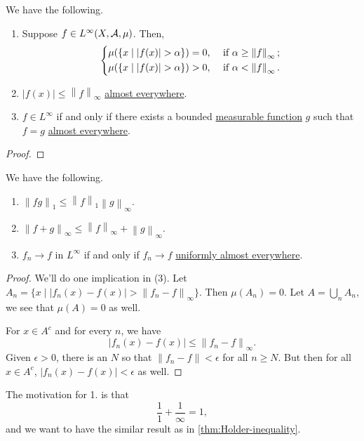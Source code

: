 \begin{lemma}
	We have the following.
	\begin{enumerate}[(1)]
		\item Suppose \(f\in L^{\infty} (X, \mathcal{\MakeUppercase{a}} , \mu )\). Then,
		      \[
			      \begin{dcases}
				      \mu (\{x\mid \left\vert f(x) \right\vert > \alpha \}) = 0, & \text{ if } \alpha \geq \left\lVert f\right\rVert _\infty; \\
				      \mu (\{x\mid \left\vert f(x) \right\vert > \alpha \}) > 0, & \text{ if } \alpha < \left\lVert f\right\rVert _\infty.    \\
			      \end{dcases}
		      \]
		\item \(\left\vert f(x) \right\vert \leq \left\lVert f\right\rVert _\infty \) \hyperref[def:mu-almost-everywhere]{almost everywhere}.
		\item \(f\in L^{\infty} \) if and only if there exists a bounded \hyperref[def:measurable-function]{measurable function} \(g\) such that \(f = g\) \hyperref[def:mu-almost-everywhere]{almost everywhere}.
	\end{enumerate}
\end{lemma}
\begin{proof}
\end{proof}

\begin{theorem}
	We have the following.
	\begin{enumerate}[(1)]
		\item \(\left\lVert fg\right\rVert _1 \leq \left\lVert f\right\rVert _1 \left\lVert g\right\rVert _\infty \).
		\item \(\left\lVert f + g\right\rVert _\infty \leq \left\lVert f\right\rVert _\infty + \left\lVert g\right\rVert _\infty \).
		\item \(f_{n} \to f\) in \(L^{\infty} \) if and only if \(f_{n} \to f\) \hyperref[def:uniformly-almost-everywhere]{uniformly almost everywhere}.
	\end{enumerate}
\end{theorem}
\begin{proof}
	We'll do one implication in (3). Let \(A_{n} = \{x\mid \left\vert f_{n} (x) - f(x) \right\vert > \left\lVert f_{n} - f\right\rVert_\infty  \}\).
	Then \(\mu (A_{n} ) = 0\). Let \(A = \bigcup_{n} A_{n} \), we see that \(\mu (A)= 0\) as well.

	For \(x\in A^{c} \) and for every \(n\), we have
	\[
		\left\vert f_{n} (x) - f(x) \right\vert \leq \left\lVert f_{n} - f\right\rVert _\infty .
	\]
	Given \(\epsilon >0\), there is an \(N\) so that \(\left\lVert f_{n} - f\right\rVert < \epsilon\) for all \(n\geq N\). But then for all
	\(x\in A^{c} \), \(\left\vert f_{n} (x) - f(x) \right\vert <\epsilon \) as well.
\end{proof}
\begin{remark}
	The motivation for 1. is that
	\[
		\frac{1}{1} + \frac{1}{\infty } = 1,
	\]
	and we want to have the similar result as in \autoref{thm:Holder-inequality}.
\end{remark}


